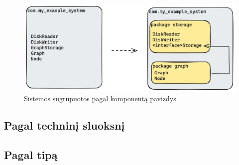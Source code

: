 \begin{figure}[H]
    \centering
    \includegraphics[scale=0.2]{img/component_packaging}
    \caption{Sistemos sugrupuotos pagal komponentą pavizdys}
    \label{img:component_packaging}
\end{figure}


\subsection{Pagal techninį sluoksnį}
\subsection{Pagal tipą}